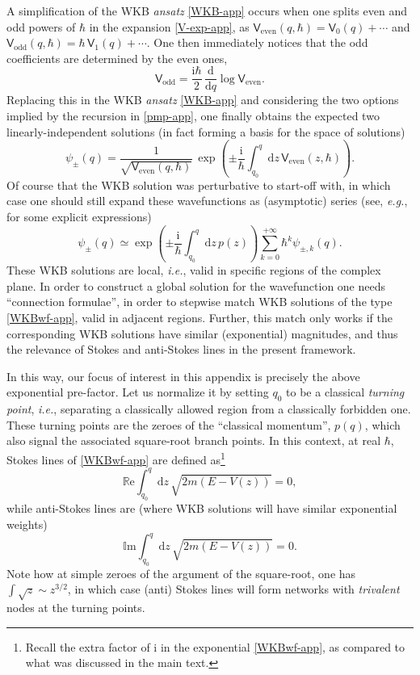 \documentclass[11pt,a4paper]{article}
\newcommand{\be}{\begin{equation}}
\newcommand{\ee}{\end{equation}}
\def\im{{\mathbb{I}}{\mathrm{m}}}
\def\re{{\mathbb{R}}{\mathrm{e}}}
\newcommand{\rmi}{{\mathrm{i}}}
\newcommand{\rmd}{{\mathrm{d}}}
\begin{document}
A simplification of the WKB \textit{ansatz} \eqref{WKB-app} occurs when one splits even and odd powers of $\hbar$ in the expansion \eqref{V-exp-app}, as $\mathsf{V}_{\text{even}} (q,\hbar) = \mathsf{V}_0 (q) + \cdots$ and $\mathsf{V}_{\text{odd}} (q,\hbar) = \hbar\, \mathsf{V}_1 (q) + \cdots$. One then immediately notices that the odd coefficients are determined by the even ones,
%
\be
\mathsf{V}_{\text{odd}} = \frac{\rmi\hbar}{2}\, \frac{\rmd}{\rmd q} \log \mathsf{V}_{\text{even}}.
\ee
%
\noindent
Replacing this in the WKB \textit{ansatz} \eqref{WKB-app} and considering the two options implied by the recursion in \eqref{pmp-app}, one finally obtains the expected two linearly-independent solutions (in fact forming a basis for the space of solutions)
%
\be
\psi_{\pm} (q) = \frac{1}{\sqrt{\mathsf{V}_\text{even} (q,\hbar)}}\, \exp \left( \pm \frac{\rmi}{\hbar} \int_{q_0}^q \rmd z\, \mathsf{V}_\text{even} (z,\hbar) \right).
\ee
%
\noindent
Of course that the WKB solution was perturbative to start-off with, in which case one should still expand these wavefunctions as (asymptotic) series (see, \textit{e.g.}, \cite{cm16} for some explicit expressions)
%
\be
\label{WKBwf-app}
\psi_{\pm} (q) \simeq \exp \left( \pm \frac{\rmi}{\hbar} \int_{q_0}^q \rmd z\, p (z) \right) \sum_{k=0}^{+\infty} \hbar^k \psi_{\pm,k} (q).
\ee
%
\noindent
These WKB solutions are local, \textit{i.e.}, valid in specific regions of the complex plane. In order to construct a global solution for the wavefunction one needs ``connection formulae'', in order to stepwise match WKB solutions of the type \eqref{WKBwf-app}, valid in adjacent regions. Further, this match only works if the corresponding WKB solutions have similar (exponential) magnitudes, and thus the relevance of Stokes and anti-Stokes lines in the present framework.

In this way, our focus of interest in this appendix is precisely the above exponential pre-factor. Let us normalize it by setting $q_0$ to be a classical \textit{turning point}, \textit{i.e.}, separating a classically allowed region from a classically forbidden one. These turning points are the zeroes of the ``classical momentum'', $p(q)$, which also signal the associated square-root branch points. In this context, at real $\hbar$, Stokes lines of \eqref{WKBwf-app} are defined as\footnote{Recall the extra factor of $\rmi$ in the exponential \eqref{WKBwf-app}, as compared to what was discussed in the main text.}
%
\be
\re \int_{q_0}^q \rmd z\, \sqrt{2m \left( E - V(z) \right)} = 0,
\ee
%
\noindent
while anti-Stokes lines are (where WKB solutions will have similar exponential weights)
%
\be
\label{WKBantistokes-app}
\im \int_{q_0}^q \rmd z\, \sqrt{2m \left( E - V(z) \right)} = 0.
\ee
%
\noindent
Note how at simple zeroes of the argument of the square-root, one has $\int \sqrt{z} \sim z^{3/2}$, in which case (anti) Stokes lines will form networks with \textit{trivalent} nodes at the turning points. 
\end{document}
